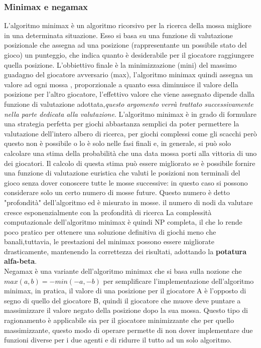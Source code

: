 \subsubsection{Minimax e negamax}
L'algoritmo minimax\cite{itwiki:125837390} è un algoritmo ricorsivo per la ricerca della mossa migliore in una determinata situazione. Esso si basa su una funzione di valutazione posizionale che assegna ad una posizione (rappresentante un possibile stato del gioco) un punteggio,
che indica quanto è desiderabile per il giocatore raggiungere quella posizione.
L'obbiettivo finale è la minimizzazione (mini) del massimo guadagno del giocatore avversario (max),
l'algoritmo minimax quindi  assegna un valore ad ogni mossa , proporzionale a quanto essa diminuisce il valore della posizione per l'altro giocatore,
l'effettivo valore che viene assegnato dipende dalla funzione di valutazione adottata,\emph{questo argomento verrà trattato successivamente nella parte dedicata alla valutazione}.
L'algoritmo minimax è in grado di formulare una strategia perfetta per giochi abbastanza semplici da poter permettere 
la valutazione dell'intero albero di ricerca, per giochi complessi come gli scacchi però questo non è possibile o lo è 
solo nelle fasi finali e, in generale, si può solo calcolare una stima della probabilità che una data mossa porti alla vittoria di uno dei giocatori.
Il calcolo di questa stima può essere migliorato se è possibile fornire una funzione di valutazione euristica che
valuti le posizioni non terminali del gioco senza dover conoscere tutte le mosse successive: in questo caso si possono
considerare solo un certo numero di mosse future. Questo numero è detto "profondità" dell'algoritmo ed è misurato
in mosse. il numero di nodi da valutare cresce esponenzialmente con la profondità di ricerca La complessità computazionale dell'algoritmo minimax è quindi 
NP completa, il che lo rende poco pratico per ottenere una soluzione definitiva di giochi meno che banali,tuttavia, le prestazioni del minimax possono essere migliorate drasticamente,
mantenendo la correttezza dei risultati, adottando la \textbf{potatura alfa-beta}.
\\Negamax è una variante dell'algoritmo minimax che si basa sulla nozione che $max(a,b)= -min(-a,-b)$ per semplificare l'implementazione dell'algoritmo minimax,
in pratica, il valore di una posizione per il giocatore A è l'opposto di segno di quello del giocatore B, quindi il giocatore che muove deve puntare a massimizzare il valore negato della posizione
dopo la sua mossa. Questo tipo di ragionamento è applicabile sia per il giocatore minimizzante che per quello massimizzante, questo modo di operare permette di non dover implementare due funzioni diverse per i due agenti 
e di ridurre il tutto ad un solo algoritmo.



